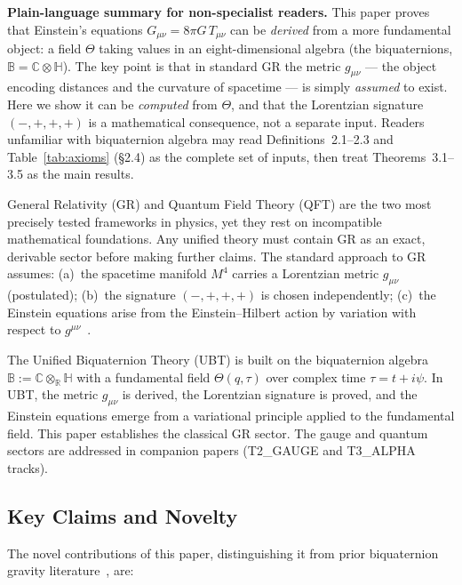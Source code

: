\documentclass[12pt,a4paper]{article}
\theoremstyle{definition}
\theoremstyle{remark}
\newcommand{\BB}{\mathbb{B}}
\newcommand{\CC}{\mathbb{C}}
\newcommand{\RR}{\mathbb{R}}
\newcommand{\HH}{\mathbb{H}}
\begin{document}
\noindent\textbf{Plain-language summary for non-specialist readers.}
This paper proves that Einstein's equations $G_{\mu\nu} = 8\pi G\,T_{\mu\nu}$
can be \emph{derived} from a more fundamental object: a field $\Theta$
taking values in an eight-dimensional algebra (the biquaternions,
$\BB = \CC\otimes\HH$).
The key point is that in standard GR the metric $g_{\mu\nu}$ --- the object
encoding distances and the curvature of spacetime --- is simply \emph{assumed}
to exist.
Here we show it can be \emph{computed} from $\Theta$, and that the Lorentzian
signature $(-,+,+,+)$ is a mathematical consequence, not a separate input.
Readers unfamiliar with biquaternion algebra may read Definitions~2.1--2.3
and Table~\ref{tab:axioms} (§2.4) as the complete set of inputs, then treat
Theorems~3.1--3.5 as the main results.

General Relativity (GR) and Quantum Field Theory (QFT) are the two most
precisely tested frameworks in physics, yet they rest on incompatible
mathematical foundations.
Any unified theory must contain GR as an exact, derivable sector before
making further claims.
The standard approach to GR assumes:
(a)~the spacetime manifold $M^4$ carries a Lorentzian metric $g_{\mu\nu}$
(postulated);
(b)~the signature $(-,+,+,+)$ is chosen independently;
(c)~the Einstein equations arise from the Einstein--Hilbert action by
variation with respect to $g^{\mu\nu}$~\cite{einstein1915,hilbert1915}.

The Unified Biquaternion Theory (UBT) is built on the biquaternion algebra
$\BB := \CC\otimes_\RR\HH$ with a fundamental field
$\Theta(q,\tau)$ over complex time $\tau = t + i\psi$.
In UBT, the metric $g_{\mu\nu}$ is derived, the Lorentzian signature is proved,
and the Einstein equations emerge from a variational principle applied to
the fundamental field.
This paper establishes the classical GR sector.
The gauge and quantum sectors are addressed in companion papers
(T2\_GAUGE and T3\_ALPHA tracks).

\subsection{Key Claims and Novelty}

The novel contributions of this paper, distinguishing it from prior biquaternion
gravity literature~\cite{adler1995,finkelstein1962,deleo1996}, are:
\end{document}
